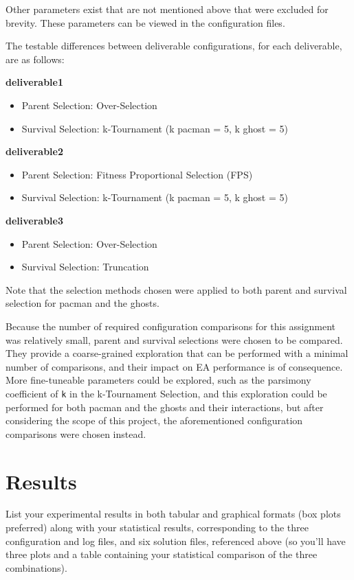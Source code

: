 \documentclass[11pt]{article}
\begin{document}
Other parameters exist that are not mentioned above that were excluded for brevity. These parameters can be 
viewed in the configuration files.

The testable differences between deliverable configurations, for each deliverable, are as follows:

\textbf{deliverable1}
\begin{itemize}[leftmargin=.8in]
    \item Parent Selection: Over-Selection
    \item Survival Selection: k-Tournament (k pacman = 5, k ghost = 5)
\end{itemize}

\textbf{deliverable2}
\begin{itemize}[leftmargin=.8in]
    \item Parent Selection: Fitness Proportional Selection (FPS)
    \item Survival Selection: k-Tournament (k pacman = 5, k ghost = 5)
\end{itemize}

\textbf{deliverable3}
\begin{itemize}[leftmargin=.8in]
    \item Parent Selection: Over-Selection
    \item Survival Selection: Truncation
\end{itemize}

Note that the selection methods chosen were applied to both parent and survival selection for pacman and the ghosts.

Because the number of required configuration comparisons for this assignment was relatively small, parent and
survival selections were chosen to be compared. They provide a coarse-grained exploration that can be
performed with a minimal number of comparisons, and their impact on EA performance is of consequence. More fine-tuneable
parameters could be explored, such as the parsimony coefficient of \texttt{k} in the k-Tournament Selection, and this exploration could be performed for both
pacman and the ghosts and their interactions, but after considering the scope of this project, the aforementioned configuration
comparisons were chosen instead.


\section{Results}
List your experimental results in both tabular and graphical formats (box plots preferred)
along with your statistical results, corresponding to the three configuration and log files, and six
solution files, referenced above (so you’ll have three plots and a table containing your statistical
comparison of the three combinations).
\end{document}
